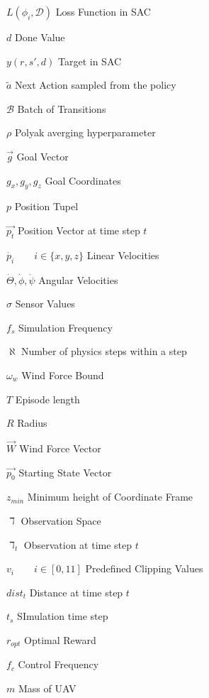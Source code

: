 \documentclass[bachelor,english]{infothesis}
\begin{document}
\begin{description}
	\item $L(\phi_i, \mathcal{D})$ \dotfill Loss Function in SAC
	\item $d$ \dotfill Done Value
	\item $y(r, s', d)$ \dotfill Target in SAC
	\item $\tilde{a}$ \dotfill Next Action sampled from the policy
	\item $\mathcal{B}$ \dotfill Batch of Transitions
	\item $\rho$ \dotfill Polyak averging hyperparameter
	\\
	\item $\overrightarrow{g}$ \dotfill Goal Vector
	\item $g_x, g_y, g_z$ \dotfill Goal Coordinates
	\item $p$ \dotfill Position Tupel
	\item $\overrightarrow{p_t}$ \dotfill Position Vector at time step $t$
	\item $\dot{p_i} \qquad i \in \{x,y,z\}$ \dotfill Linear Velocities
	\item $\dot{\Theta}, \dot{\phi}, \dot{\psi}$ \dotfill Angular Velocities
	\item $\sigma$ \dotfill Sensor Values
	\item $f_s$ \dotfill Simulation Frequency
	\item $\aleph$ \dotfill Number of physics steps within a step
	\item $\omega_w$ \dotfill Wind Force Bound
	\item $T$ \dotfill Episode length
	\item $R$ \dotfill Radius
	\item $\overrightarrow{W}$ \dotfill Wind Force Vector
	\item $\overrightarrow{p_0}$ \dotfill Starting State Vector
	\item $z_{min}$ \dotfill Minimum height of Coordinate Frame
	\item $\daleth$ \dotfill Observation Space
	\item $\daleth_t$ \dotfill Observation at time step $t$
	\item $v_i \qquad i \in [0,11]$ \dotfill Predefined Clipping Values
	\item $dist_t$ \dotfill Distance at time step $t$
	\item $t_s$ \dotfill SImulation time step
	\item $r_{opt}$ \dotfill Optimal Reward
	\item $f_c$ \dotfill Control Frequency
	\item $m$ \dotfill Mass of UAV

\end{description}
\end{document}
